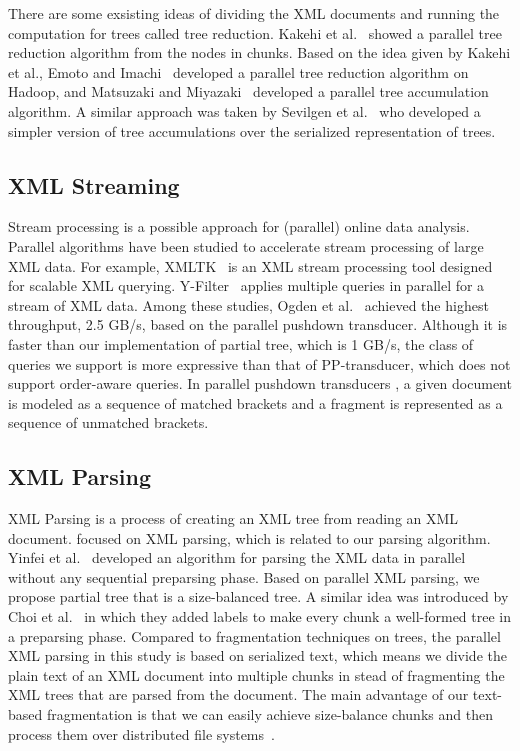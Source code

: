 There are some exsisting ideas of dividing the XML documents and running the
computation for trees called tree reduction. Kakehi et al.~\cite{KaME07} showed
a parallel tree reduction algorithm from the nodes in chunks. Based on the idea
given by Kakehi et al., Emoto and Imachi~\cite{EmIm12} developed a parallel tree
reduction algorithm on Hadoop, and Matsuzaki and Miyazaki~\cite{MaMi16}
developed a parallel tree accumulation algorithm. A similar approach was taken
by Sevilgen et al.~\cite{SAFu05} who developed a simpler version of tree
accumulations over the serialized representation of trees.

\subsection{XML Streaming}

Stream processing is a possible approach for (parallel) online data analysis.
Parallel algorithms have been studied to accelerate stream processing of large
XML data. For example, XMLTK~\cite{AGGR02} is an XML stream processing tool
designed for scalable XML querying. Y-Filter~\cite{ZhPC10} applies multiple
queries in parallel for a stream of XML data. Among these studies, Ogden et
al.~\cite{OgTP13} achieved the highest throughput, 2.5 GB/s, based on the
parallel pushdown transducer. Although it is faster than our implementation of
partial tree, which is 1 GB/s, the class of queries we support is more
expressive than that of PP-transducer, which does not support order-aware
queries. In parallel pushdown transducers \cite{LiZZ17}, a given document is
modeled as a sequence of matched brackets and a fragment is represented as a
sequence of unmatched brackets.

\subsection{XML Parsing}

XML Parsing is a process of creating an XML tree from reading an XML document.
\cite{PLZC07,WZYu08} focused on XML parsing, which is related to our parsing
algorithm. Yinfei et al.~\cite{PaZC08} developed an algorithm for parsing the
XML data in parallel without any sequential preparsing phase. 
Based on parallel XML parsing, we propose partial tree that is a size-balanced
tree. A similar idea was introduced by Choi et al.~\cite{ChLL14} in which they 
added labels to make every chunk a well-formed tree in a preparsing phase.
Compared to fragmentation techniques on trees, the parallel XML parsing in 
this study is based on serialized text, which means we divide the
plain text of an XML document into multiple chunks in stead of fragmenting the 
XML trees that are parsed from the document. 
The main advantage of our text-based fragmentation is that we can easily achieve
size-balance chunks and then process them over distributed file systems~\cite{dfs}. 

